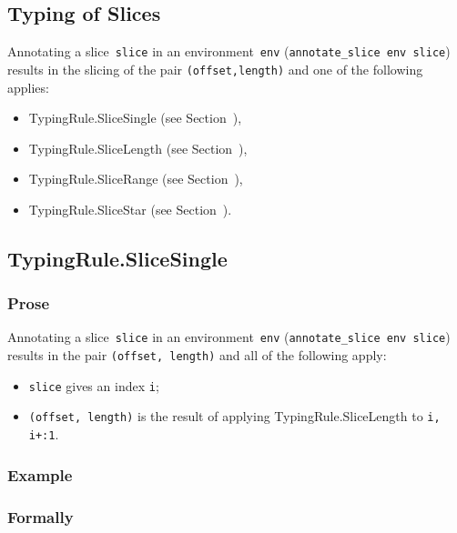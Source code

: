 \documentclass{book}
\begin{document}
\begin{itemize}
\chapter{Typing of Slices \label{chap:typingslices}}

Annotating a slice~\texttt{slice} in an environment~\texttt{env}
(\texttt{annotate\_slice env slice}) results in the slicing of the pair \texttt{(offset,length)} and one of the following applies:
\begin{itemize}
\item TypingRule.SliceSingle (see Section~),
\item TypingRule.SliceLength (see Section~),
\item TypingRule.SliceRange (see Section~),
\item TypingRule.SliceStar (see Section~).
\end{itemize}

\section{TypingRule.SliceSingle \label{sec:TypingRule.SliceSingle}}

  \subsection{Prose}
   Annotating a slice~\texttt{slice} in an environment~\texttt{env}
(\texttt{annotate\_slice env slice}) results in the pair \texttt{(offset, length)} and all of the following apply:
   \begin{itemize}
   \item \texttt{slice} gives an index \texttt{i};
   \item \texttt{(offset, length)} is the result of applying TypingRule.SliceLength to \texttt{i, i+:1}.
   \end{itemize}

  \subsection{Example}



\begin{emptyformal}
    \subsection{Formally}
\end{emptyformal}


\end{itemize}
\end{document}
